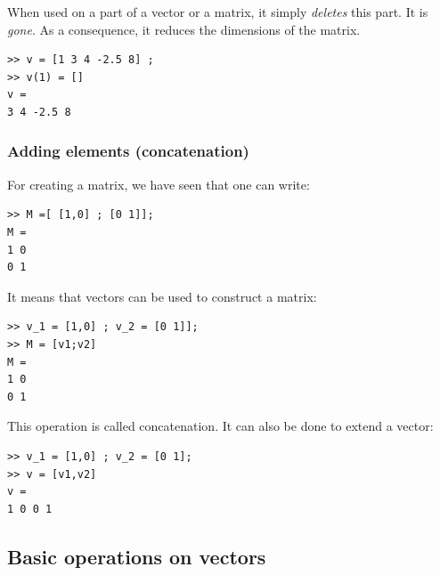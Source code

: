 			When used on a part of a vector or a matrix, it simply \emph{deletes} this part.
			It is \emph{gone}.
			As a consequence, it reduces the dimensions of the matrix.
\begin{lstlisting}
>> v = [1 3 4 -2.5 8] ;
>> v(1) = []
v = 
3 4 -2.5 8
\end{lstlisting}

		\subsubsection{Adding elements (concatenation)}
			For creating a matrix, we have seen that one can write:
\begin{lstlisting}
>> M =[ [1,0] ; [0 1]];
M = 
1 0
0 1
\end{lstlisting}
			It means that vectors can be used to construct a matrix:
\begin{lstlisting}
>> v_1 = [1,0] ; v_2 = [0 1]];
>> M = [v1;v2]
M = 
1 0
0 1
\end{lstlisting}
			This operation is called concatenation.
			It can also be done to extend a vector:
\begin{lstlisting}
>> v_1 = [1,0] ; v_2 = [0 1];
>> v = [v1,v2]
v = 
1 0 0 1
\end{lstlisting}

	\subsection{Basic operations on vectors}
